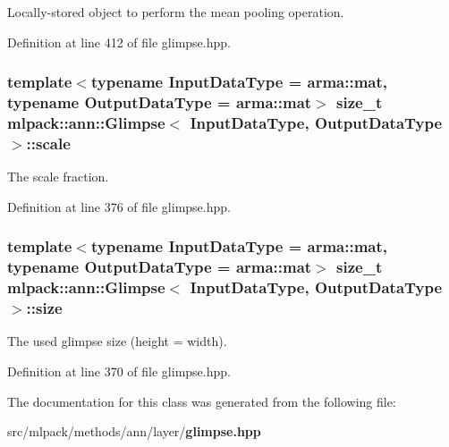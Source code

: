 Locally-\/stored object to perform the mean pooling operation. 



Definition at line 412 of file glimpse.\+hpp.

\subsubsection[{scale}]{\setlength{\rightskip}{0pt plus 5cm}template$<$typename Input\+Data\+Type  = arma\+::mat, typename Output\+Data\+Type  = arma\+::mat$>$ size\+\_\+t {\bf mlpack\+::ann\+::\+Glimpse}$<$ Input\+Data\+Type, Output\+Data\+Type $>$\+::scale\hspace{0.3cm}{\ttfamily [private]}}\label{classmlpack_1_1ann_1_1Glimpse_a7cb5eab998487e2ddb4140b3c3ae4be9}


The scale fraction. 



Definition at line 376 of file glimpse.\+hpp.

\subsubsection[{size}]{\setlength{\rightskip}{0pt plus 5cm}template$<$typename Input\+Data\+Type  = arma\+::mat, typename Output\+Data\+Type  = arma\+::mat$>$ size\+\_\+t {\bf mlpack\+::ann\+::\+Glimpse}$<$ Input\+Data\+Type, Output\+Data\+Type $>$\+::size\hspace{0.3cm}{\ttfamily [private]}}\label{classmlpack_1_1ann_1_1Glimpse_ab9c1eb391f5a355f198c4f399e25f1f3}


The used glimpse size (height = width). 



Definition at line 370 of file glimpse.\+hpp.



The documentation for this class was generated from the following file\+:\begin{DoxyCompactItemize}
\item 
src/mlpack/methods/ann/layer/{\bf glimpse.\+hpp}\end{DoxyCompactItemize}
